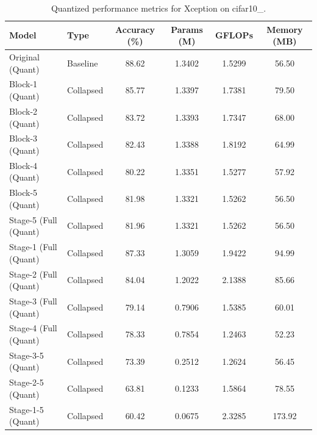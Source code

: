\begin{table}
\caption{Quantized performance metrics for Xception on cifar10_.}
\label{tab:Xception_cifar10__quant}
\begin{tabular}{llcccc}
\toprule
Model & Type & Accuracy (\%) & Params (M) & GFLOPs & Memory (MB) \\
\midrule
Original
(Quant) & Baseline & 88.62 & 1.3402 & 1.5299 & 56.50 \\
Block-1
(Quant) & Collapsed & 85.77 & 1.3397 & 1.7381 & 79.50 \\
Block-2
(Quant) & Collapsed & 83.72 & 1.3393 & 1.7347 & 68.00 \\
Block-3
(Quant) & Collapsed & 82.43 & 1.3388 & 1.8192 & 64.99 \\
Block-4
(Quant) & Collapsed & 80.22 & 1.3351 & 1.5277 & 57.92 \\
Block-5
(Quant) & Collapsed & 81.98 & 1.3321 & 1.5262 & 56.50 \\
Stage-5 (Full
(Quant) & Collapsed & 81.96 & 1.3321 & 1.5262 & 56.50 \\
Stage-1 (Full
(Quant) & Collapsed & 87.33 & 1.3059 & 1.9422 & 94.99 \\
Stage-2 (Full
(Quant) & Collapsed & 84.04 & 1.2022 & 2.1388 & 85.66 \\
Stage-3 (Full
(Quant) & Collapsed & 79.14 & 0.7906 & 1.5385 & 60.01 \\
Stage-4 (Full
(Quant) & Collapsed & 78.33 & 0.7854 & 1.2463 & 52.23 \\
Stage-3-5
(Quant) & Collapsed & 73.39 & 0.2512 & 1.2624 & 56.45 \\
Stage-2-5
(Quant) & Collapsed & 63.81 & 0.1233 & 1.5864 & 78.55 \\
Stage-1-5
(Quant) & Collapsed & 60.42 & 0.0675 & 2.3285 & 173.92 \\
\bottomrule
\end{tabular}
\end{table}
